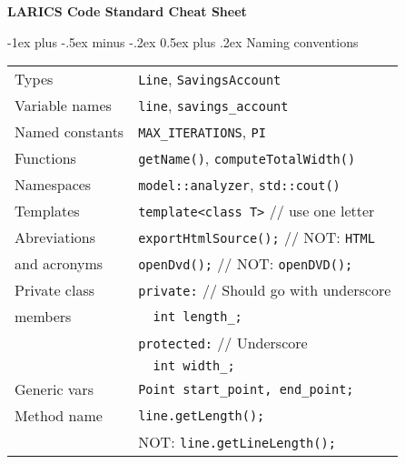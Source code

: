 \documentclass[10pt,landscape]{article}
\makeatletter
\renewcommand{\section}{\@startsection{section}{1}{0mm}%
                                {-1ex plus -.5ex minus -.2ex}%
                                {0.5ex plus .2ex}%
                                {\normalfont\large\bfseries}}
\makeatother
\begin{document}
\raggedright
\footnotesize
\begin{multicols}{3}


\setlength{\premulticols}{1pt}
\setlength{\postmulticols}{1pt}
\setlength{\multicolsep}{1pt}
\setlength{\columnsep}{2pt}

\begin{center}
     \Large{\textbf{LARICS Code Standard Cheat Sheet}} \\
\end{center}

\section{Naming conventions}
\begin{tabular}{@{}ll@{}}
	Types           & \verb!Line!, \verb!SavingsAccount! \\
	Variable names  & \verb!line!, \verb!savings_account! \\
	Named constants & \verb!MAX_ITERATIONS!, \verb!PI! \\
	Functions       & \verb!getName()!, \verb!computeTotalWidth()! \\
	Namespaces      & \verb!model::analyzer!, \verb!std::cout()! \\
	Templates       & \verb!template<class T>! // use one letter\\
	Abreviations	& \verb!exportHtmlSource();! // NOT: \verb!HTML! \\
	and acronyms    & \verb!openDvd();! // NOT: \verb!openDVD();! \\
	Private class   & \verb!private:! // Should go with underscore \\
	members         & \verb!  int length_;! \\
	                & \verb!protected:! // Underscore \\
	                & \verb!  int width_;! \\
	Generic vars    & \verb!Point start_point, end_point;! \\
	Method name     & \verb!line.getLength();! \\ 
	                & \hspace{0.5cm} NOT: \verb!line.getLineLength();! \\	
\end{tabular}


\end{multicols}
\end{document}
